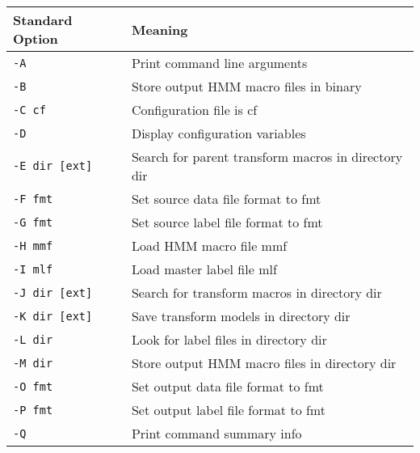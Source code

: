\begin{center}


\begin{tabular}{|p{2.6cm}|p{8.2cm}|} \hline


Standard Option &   Meaning  \\ \hline


\texttt{-A}     &   Print command line arguments\\


\texttt{-B}     &  Store output HMM macro files in binary \\


\texttt{-C cf}  &   Configuration file is cf \\


\texttt{-D}     &   Display configuration variables\\


\texttt{-E dir [ext]}  &  Search for parent transform macros in directory dir \\


\texttt{-F fmt}  &  Set source data file format to fmt \\


\texttt{-G fmt}  &  Set source label file format to fmt \\


\texttt{-H mmf}  &  Load HMM macro file mmf \\


\texttt{-I mlf}  &  Load master label file mlf \\


\texttt{-J dir [ext]}  &  Search for transform macros in directory dir \\


\texttt{-K dir [ext]}  &  Save transform models in directory dir  \\


\texttt{-L dir}  &  Look for label files in directory dir \\


\texttt{-M dir}  &  Store output HMM macro files in directory dir \\


\texttt{-O fmt}  &  Set output data file format to fmt \\


\texttt{-P fmt}  &  Set output label file format to fmt \\


\texttt{-Q}     &   Print command summary info\\



\end{tabular}
\end{center}
